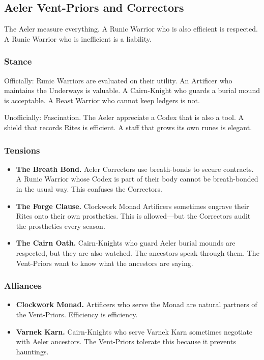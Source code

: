 \subsection{Aeler Vent-Priors and Correctors}

The Aeler measure everything. A Runic Warrior who is also efficient is respected. A Runic Warrior who is inefficient is a liability.

\subsubsection{Stance}

Officially: Runic Warriors are evaluated on their utility. An Artificer who maintains the Underways is valuable. A Cairn-Knight who guards a burial mound is acceptable. A Beast Warrior who cannot keep ledgers is not.

Unofficially: Fascination. The Aeler appreciate a Codex that is also a tool. A shield that records Rites is efficient. A staff that grows its own runes is elegant.

\subsubsection{Tensions}

\begin{itemize}
\item \textbf{The Breath Bond.} Aeler Correctors use breath-bonds to secure contracts. A Runic Warrior whose Codex is part of their body cannot be breath-bonded in the usual way. This confuses the Correctors.
\item \textbf{The Forge Clause.} Clockwork Monad Artificers sometimes engrave their Rites onto their own prosthetics. This is allowed—but the Correctors audit the prosthetics every season.
\item \textbf{The Cairn Oath.} Cairn-Knights who guard Aeler burial mounds are respected, but they are also watched. The ancestors speak through them. The Vent-Priors want to know what the ancestors are saying.
\end{itemize}

\subsubsection{Alliances}

\begin{itemize}
\item \textbf{Clockwork Monad.} Artificers who serve the Monad are natural partners of the Vent-Priors. Efficiency is efficiency.
\item \textbf{Varnek Karn.} Cairn-Knights who serve Varnek Karn sometimes negotiate with Aeler ancestors. The Vent-Priors tolerate this because it prevents hauntings.
\end{itemize}

